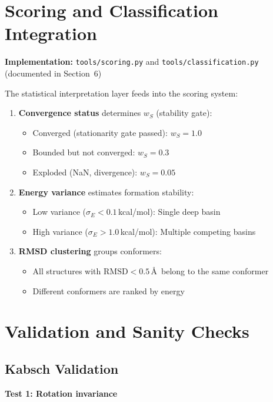 \documentclass[11pt]{article}
\begin{document}
\section{Scoring and Classification Integration}

\textbf{Implementation:} \texttt{tools/scoring.py} and \texttt{tools/classification.py} (documented in Section~6)

The statistical interpretation layer feeds into the scoring system:

\begin{enumerate}
\item \textbf{Convergence status} determines $w_S$ (stability gate):
\begin{itemize}
\item Converged (stationarity gate passed): $w_S = 1.0$
\item Bounded but not converged: $w_S = 0.3$
\item Exploded (NaN, divergence): $w_S = 0.05$
\end{itemize}

\item \textbf{Energy variance} estimates formation stability:
\begin{itemize}
\item Low variance ($\sigma_E < 0.1$\,kcal/mol): Single deep basin
\item High variance ($\sigma_E > 1.0$\,kcal/mol): Multiple competing basins
\end{itemize}

\item \textbf{RMSD clustering} groups conformers:
\begin{itemize}
\item All structures with $\text{RMSD} < 0.5$\,\AA\ belong to the same conformer
\item Different conformers are ranked by energy
\end{itemize}
\end{enumerate}

\section{Validation and Sanity Checks}

\subsection{Kabsch Validation}

\textbf{Test 1: Rotation invariance}
\end{document}
